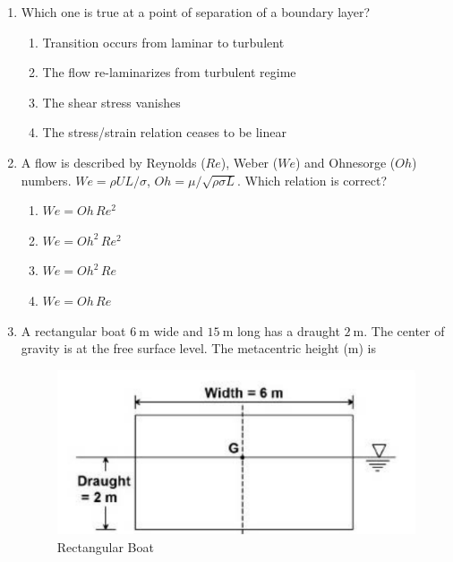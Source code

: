 \documentclass[journal,12pt,onecolumn]{IEEEtran}
\begin{document}
\begin{enumerate}[label=\arabic*)]
\item Which one is true at a point of separation of a boundary layer?  
\hfill{} \\

\vspace{0.2cm}
\begin{enumerate}[label=\alph*)]
\item Transition occurs from laminar to turbulent
\item The flow re-laminarizes from turbulent regime
\item The shear stress vanishes
\item The stress/strain relation ceases to be linear
\end{enumerate}
\vspace{0.5cm}

\item A flow is described by Reynolds ($Re$), Weber ($We$) and Ohnesorge ($Oh$) numbers. $We = \rho U L / \sigma$, $Oh = \mu / \sqrt{\rho \sigma L}$. Which relation is correct?  
\hfill{} \\

\vspace{0.2cm}
\begin{enumerate}[label=\alph*)]
\item $We = Oh \, Re^2$
\item $We = Oh^2 \, Re^2$
\item $We = Oh^2 \, Re$
\item $We = Oh \, Re$
\end{enumerate}
\vspace{0.5cm}

\item A rectangular boat $6\ \mathrm{m}$ wide and $15\ \mathrm{m}$ long has a draught $2\ \mathrm{m}$. The center of gravity is at the free surface level. The metacentric height (m) is  

\begin{figure}[htbp]
  \centering
  \includegraphics[width=.55\linewidth]{figs/B/fig3.png} 
  \caption{Rectangular Boat}
  \label{B/fig3}
\end{figure}
\hfill{} \\


\end{enumerate}
\end{document}
